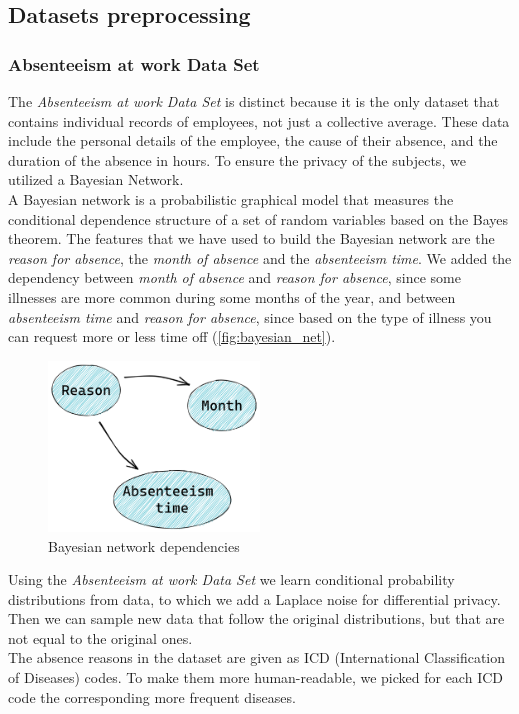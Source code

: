 \subsection{Datasets preprocessing}
\subsubsection*{Absenteeism at work Data Set}
The \textit{Absenteeism at work Data Set} is distinct because it is the only dataset that contains individual records of employees, not just a collective average. These data include the personal details of the employee, the cause of their absence, and the duration of the absence in hours. To ensure the privacy of the subjects, we utilized a Bayesian Network. \\ 
A Bayesian network is a probabilistic graphical model that measures the conditional dependence structure of a set of random variables based on the Bayes theorem. The features that we have used to build the Bayesian network are the \textit{reason for absence}, the \textit{month of absence} and the \textit{absenteeism time}. We added the dependency between \textit{month of absence} and \textit{reason for absence}, since some illnesses are more common during some months of the year, and between \textit{absenteeism time} and \textit{reason for absence}, since based on the type of illness you can request more or less time off (\autoref{fig:bayesian_net}). \\
\begin{figure}[h] 
    \centering
    \includegraphics[width=0.5\textwidth]{images/bayesian_net.png}
    \caption{Bayesian network dependencies}
    \label{fig:bayesian_net}
  \end{figure}
Using the \textit{Absenteeism at work Data Set} we learn conditional probability distributions from data, to which we add a Laplace noise for differential privacy. Then we can sample new data that follow the original distributions, but that are not equal to the original ones. \\
The absence reasons in the dataset are given as ICD (International Classification of Diseases) codes. To make them more human-readable, we picked for each ICD code the corresponding more frequent diseases.
